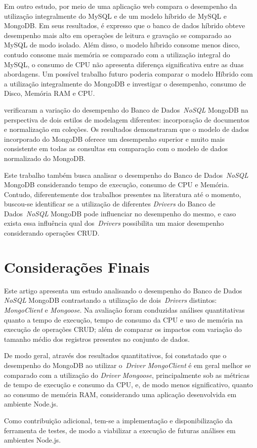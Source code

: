 \documentclass[12pt]{article}
\begin{document}
Em outro estudo, \cite{ongo:2018} por meio de uma aplicação web compara o desempenho da utilização integralmente do MySQL e de um modelo híbrido de MySQL e MongoDB. 
Em seus resultados, é expresso que o banco de dados híbrido obteve desempenho mais alto em operações de leitura e gravação se comparado ao MySQL de modo isolado. 
Além disso, o modelo híbrido consome menos disco, contudo consome mais memória se comparado com a utilização integral do MySQL, o consumo de CPU não apresenta diferença significativa entre as duas abordagens. 
Um possível trabalho futuro poderia comparar o modelo Híbrido com a utilização integralmente do MongoDB e investigar o desempenho, consumo de Disco, Memória RAM e CPU.

\cite{kanade2014study} verificaram a variação do desempenho do Banco de Dados~\emph{NoSQL} MongoDB na perspectiva de dois estilos de modelagem diferentes: incorporação de documentos e normalização em coleções. Os resultados demonstraram que o modelo de dados incorporado do MongoDB oferece um desempenho superior e muito mais consistente em todas as consultas em comparação com o modelo de dados normalizado do MongoDB.

Este trabalho também busca analisar o desempenho do Banco de Dados~\emph{NoSQL} MongoDB considerando tempo de execução, consumo de CPU e Memória. Contudo, diferentemente dos trabalhos presentes na literatura até o momento, buscou-se identificar se a utilização de diferentes \emph{Drivers} do Banco de Dados~\emph{NoSQL} MongoDB pode influenciar no desempenho do mesmo, e caso exista essa influência qual dos~\emph{Drivers} possibilita um maior desempenho considerando operações CRUD.

\section{Considerações Finais}
\label{section:consideracoes}

Este artigo apresenta um estudo analisando o desempenho do Banco de Dados \emph{NoSQL} MongoDB contrastando a utilização de dois~\emph{Drivers} distintos: \emph{MongoClient} e \emph{Mongoose}.
Na avaliação foram conduzidas análises quantitativas quanto a tempo de execução, tempo de consumo da CPU e uso de memória na execução de operações CRUD; além de comparar os impactos com variação do tamanho médio dos registros presentes no conjunto de dados.

De modo geral, através dos resultados quantitativos, foi constatado que o desempenho do MongoDB ao utilizar o~\emph{Driver} \emph{MongoClient} é em geral melhor se comparado com a utilização do \emph{Driver} \emph{Mongoose}, principalmente sob as métricas de tempo de execução e consumo da CPU, e, de modo menos significativo, quanto ao consumo de memória RAM, considerando uma aplicação desenvolvida em ambiente Node.js.

Como contribuição adicional, tem-se a implementação e disponibilização da ferramenta de testes, de modo a viabilizar a execução de futuras análises em ambientes Node.js.




\end{document}
